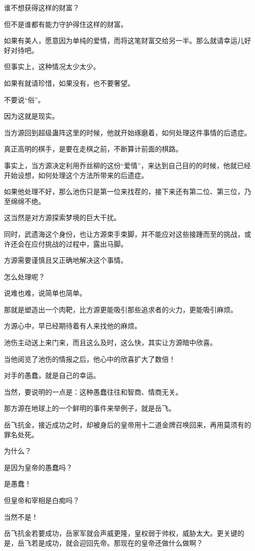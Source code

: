\begin{this_body}
谁不想获得这样的财富？

但不是谁都有能力守护得住这样的财富。

如果有美人，愿意因为单纯的爱情，而将这笔财富交给另一半。那么就请幸运儿好好对待吧。

但事实上，这种情况太少太少。

如果有就请珍惜，如果没有，也不要奢望。

不要说“俗”。

因为这就是现实。

当方源回到超级蛊阵这里的时候，他就开始琢磨着，如何处理这件事情的后遗症。

真正高明的棋手，是要在走棋之前，不断算计前面的棋路。

事实上，当方源决定利用乔丝柳的这份“爱情”，来达到自己目的的时候，他就已经开始设想，如何处理这个方法所带来的后遗症。

如果他处理不好，那么池伤只是第一位来找茬的，接下来还有第二位、第三位，乃至绵绵不绝。

这当然是对方源探索梦境的巨大干扰。

同时，武遗海这个身份，也让方源束手束脚，并不能应对这些接踵而至的挑战，或许还会在应付挑战的过程中，露出马脚。

方源需要谨慎且又正确地解决这个事情。

怎么处理呢？

说难也难，说简单也简单。

那就是塑造出一个肉靶，比方源更能吸引那些追求者的火力，更能吸引麻烦。

方源心中，早已经期待着有人来找他的麻烦。

池伤主动送上来门来，而且这么及时，这么快，其实让方源暗中欣喜。

当他阅览了池伤的情报之后，他心中的欣喜扩大了数倍！

对手的愚蠢，就是自己的幸运。

当然，要说明的一点是：这种愚蠢往往和智商、情商无关。

那方源在地球上的一个鲜明的事件来举例子，就是岳飞。

岳飞抗金，接近成功之时，却被身后的皇帝用十二道金牌召唤回来，再用莫须有的罪名处死。

为什么？

是因为皇帝的愚蠢吗？

是愚蠢！

但皇帝和宰相是白痴吗？

当然不是！

岳飞抗金若要成功，岳家军就会声威更隆，皇权弱于帅权，威胁太大。更关键的是，岳飞若是成功，就会迎回先帝。那现在的皇帝还做什么做啊？


\end{this_body}
